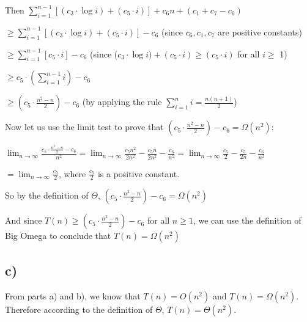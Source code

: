 \documentclass{article}
\begin{document}
Then $\sum_{i=1}^{n-1} [(c_3 \cdot \log i) + (c_5 \cdot i)] + c_6n + (c_1 + c_7 - c_6)$

$\geq \sum_{i=1}^{n-1} [(c_3 \cdot \log i) + (c_5 \cdot i)] - c_6$ \; (since $c_6,c_1,c_7$ are positive constants)

$\geq \sum_{i=1}^{n-1} [c_5 \cdot i] - c_6$  \; (since ($c_3 \cdot \log i) + (c_5 \cdot i) \geq (c_5 \cdot i)$ for all $i \geq$ 1)

$\geq c_5 \cdot (\sum_{i=1}^{n-1} i) - c_6$

$\geq (c_5 \cdot \frac{n^2-n}{2}) - c_6$ \; \; (by applying the rule $\sum_{i=1}^{n} i = \frac{n(n+1)}{2}$)


Now let us use the limit test to prove that $(c_5 \cdot \frac{n^2-n}{2}) - c_6 = \Omega(n^2)$:

$\lim_{n\to\infty} \frac{c_5 \cdot \frac{n^2-n}{2} - c_6}{n^2}
= \lim_{n\to\infty} \frac{c_5n^2}{2n^2} - \frac{c_5n}{2n^2} - \frac{c_6}{n^2}
= \lim_{n\to\infty} \frac{c_5}{2} - \frac{c_5}{2n} - \frac{c_6}{n^2}$

$= \lim_{n\to\infty} \frac{c_5}{2}$, \;where $\frac{c_5}{2}$ is a positive constant.

So by the definition of $\Theta$, $(c_5 \cdot \frac{n^2-n}{2}) - c_6 = \Omega(n^2)$

And since $T(n) \geq (c_5 \cdot \frac{n^2-n}{2}) - c_6$ for all $n \geq 1$, we can use the definition of Big Omega to conclude that $T(n) = \Omega(n^2)$

\subsection*{c)} 
From parts a) and b), we know that $T(n) = O(n^2)$ and $T(n) = \Omega(n^2)$. Therefore according to the definition of $\Theta$, $T(n) = \Theta(n^2)$.
\end{document}
